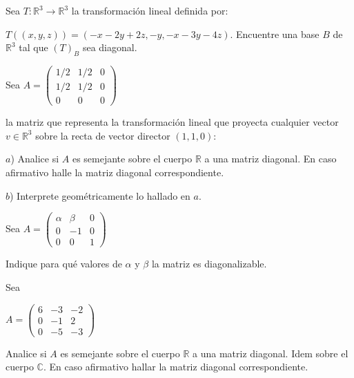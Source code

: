 \begin{exercise} 
\item 

Sea $T:\mathbb{R}^3 \rightarrow \mathbb{R}^3$ la transformación lineal definida por:

$T((x,y,z))=(-x-2y+2z,-y,-x-3y-4z)$. Encuentre una base $B$ de $\mathbb{R}^3$ tal que $(T)_B$ sea diagonal.
\end{exercise} 
\begin{exercise} 
\item
\bigskip

Sea $A=\left(\begin{array}{ccc}1/2 & 1/2 & 0  \\1/2  & 1/2 & 0
\\ 0  & 0 & 0
\end{array}
 \right)$ 

 \bigskip
 
\noindent
la matriz que representa la transformación lineal que proyecta cualquier vector $v \in \mathbb{R}^3$ sobre la recta de vector director $(1,1,0)$:


$a$) Analice si $A$ es semejante sobre el cuerpo $\mathbb{R}$ a una matriz diagonal. En caso afirmativo halle la matriz diagonal correspondiente.

$b$)
Interprete geométricamente lo hallado en $a$.

\end{exercise} 
\begin{exercise} 
\item
\bigskip

 Sea $A=\left(\begin{array}{ccc}\alpha & \beta & 0  \\0  & -1 & 0
\\ 0  & 0 & 1
\end{array}
 \right)$ 
 
 \bigskip

Indique para qué valores de $\alpha$ y $\beta$ la matriz es diagonalizable.

\end{exercise} 
\begin{exercise} 
\item 
Sea

\bigskip

 $A=\left(\begin{array}{ccc}6 & -3 & -2  \\0  & -1 & 2
\\ 0  & -5 & -3
\end{array}
 \right)$

 \bigskip
 
 
 \noindent
 Analice si $A$ es semejante sobre el cuerpo $\mathbb{R}$ a una matriz diagonal. Idem sobre el cuerpo $\mathbb{C}$. En caso afirmativo hallar la matriz diagonal correspondiente.
 
 
\end{exercise} 

